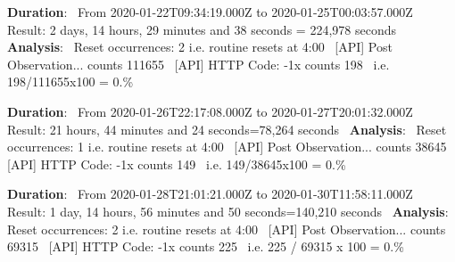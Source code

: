 \begin{DoxyEnumerate}
\begin{DoxyEnumerate}
\item {\bfseries{Duration}}\+:~\newline
 From 2020-\/01-\/22T09\+:34\+:19.\+000Z to 2020-\/01-\/25T00\+:03\+:57.\+000Z~\newline
 Result\+: 2 days, 14 hours, 29 minutes and 38 seconds = 224,978 seconds~\newline
 {\bfseries{Analysis}}\+:~\newline
 Reset occurrences\+: 2 i.\+e. routine resets at 4\+:00~\newline
 \mbox{[}A\+PI\mbox{]} Post Observation... counts 111655~\newline
 \mbox{[}A\+PI\mbox{]} H\+T\+TP Code\+: -\/1x counts 198~\newline
 i.\+e. 198/111655x100 = 0.\%~\newline

\item {\bfseries{Duration}}\+:~\newline
 From 2020-\/01-\/26T22\+:17\+:08.\+000Z to 2020-\/01-\/27T20\+:01\+:32.\+000Z~\newline
 Result\+: 21 hours, 44 minutes and 24 seconds=78,264 seconds~\newline
 {\bfseries{Analysis}}\+:~\newline
 Reset occurrences\+: 1 i.\+e. routine resets at 4\+:00~\newline
 \mbox{[}A\+PI\mbox{]} Post Observation... counts 38645~\newline
 \mbox{[}A\+PI\mbox{]} H\+T\+TP Code\+: -\/1x counts 149~\newline
 i.\+e. 149/38645x100 = 0.\%~\newline

\item {\bfseries{Duration}}\+:~\newline
 From 2020-\/01-\/28T21\+:01\+:21.\+000Z to 2020-\/01-\/30T11\+:58\+:11.\+000Z~\newline
 Result\+: 1 day, 14 hours, 56 minutes and 50 seconds=140,210 seconds~\newline
 {\bfseries{Analysis}}\+:~\newline
 Reset occurrences\+: 2 i.\+e. routine resets at 4\+:00~\newline
 \mbox{[}A\+PI\mbox{]} Post Observation... counts 69315~\newline
 \mbox{[}A\+PI\mbox{]} H\+T\+TP Code\+: -\/1x counts 225~\newline
 i.\+e. 225 / 69315 x 100 = 0.\%~\newline


\end{DoxyEnumerate}
\end{DoxyEnumerate}
